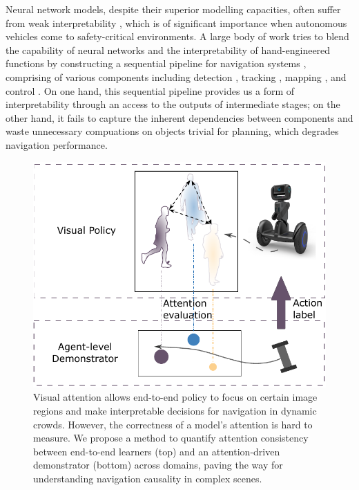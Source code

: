 \documentclass[10pt,twocolumn,letterpaper]{article}
\begin{document}
Neural network models, despite their superior modelling capacities, often suffer from weak interpretability \cite{zhang_visual_2018}, which is of significant importance when autonomous vehicles come to safety-critical environments. A large body of work tries to blend the capability of neural networks and the interpretability of hand-engineered functions by constructing a sequential pipeline for navigation systems \cite{urmson_autonomous_2009}, comprising of various components including detection \cite{he_mask_2017}, tracking \cite{bertinetto_fully-convolutional_2016, nam_learning_2016}, mapping \cite{zhang_neural_2017}, and control \cite{gupta_cognitive_2017, chen_crowd-robot_2018}. On one hand, this sequential pipeline provides us a form of interpretability through an access to the outputs of intermediate stages; on the other hand, it fails to capture the inherent dependencies between components and waste unnecessary compuations on objects trivial for planning, which degrades navigation performance. 


\begin{figure}[t]
  \centering
  \includegraphics[width=1.0\linewidth]{figures/pull.pdf}
  \caption{Visual attention allows end-to-end policy to focus on certain image regions and make interpretable decisions for navigation in dynamic crowds. However, the correctness of a model's attention is hard to measure. We propose a method to quantify attention consistency between end-to-end learners (top) and an attention-driven demonstrator (bottom) across domains, paving the way for understanding navigation causality in complex scenes.}
\end{figure}
\end{document}
